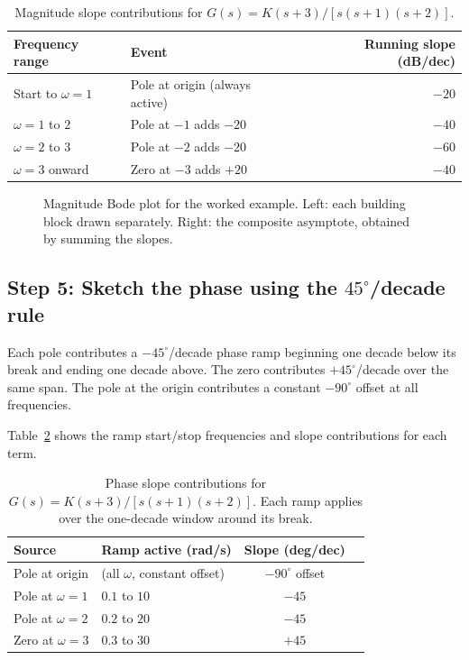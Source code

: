 \documentclass[../../book.tex]{subfiles}
\begin{document}
\begin{table}[htbp]
\centering
\caption{Magnitude slope contributions for $G(s) = K(s+3)/[s(s+1)(s+2)]$.}
\label{tab:example_mag_slopes}
\begin{tabular}{@{}llr@{}}
\toprule
Frequency range & Event & Running slope (dB/dec) \\
\midrule
Start to $\omega = 1$  & Pole at origin (always active) & $-20$ \\
$\omega = 1$ to $2$    & Pole at $-1$ adds $-20$        & $-40$ \\
$\omega = 2$ to $3$    & Pole at $-2$ adds $-20$        & $-60$ \\
$\omega = 3$ onward    & Zero at $-3$ adds $+20$        & $-40$ \\
\bottomrule
\end{tabular}
\end{table}

\begin{figure}[htbp]
  \caption{Magnitude Bode plot for the worked example.  Left: each building
    block drawn separately.  Right: the composite asymptote, obtained by
    summing the slopes.}
  \label{fig:example_magnitude}
\end{figure}

\subsection*{Step 5: Sketch the phase using the $45^\circ$/decade rule}

Each pole contributes a $-45^\circ$/decade phase ramp beginning one decade
below its break and ending one decade above.  The zero contributes
$+45^\circ$/decade over the same span.  The pole at the origin contributes a
constant $-90^\circ$ offset at all frequencies.

Table~\ref{tab:example_phase_slopes} shows the ramp start/stop frequencies
and slope contributions for each term.

\begin{table}[htbp]
\centering
\caption{Phase slope contributions for $G(s) = K(s+3)/[s(s+1)(s+2)]$.
  Each ramp applies over the one-decade window around its break.}
\label{tab:example_phase_slopes}
\begin{tabular}{@{}llcc@{}}
\toprule
Source & Ramp active (rad/s) & Slope (deg/dec) \\
\midrule
Pole at origin & (all $\omega$, constant offset) & $-90^\circ$ offset \\
Pole at $\omega = 1$ & $0.1$ to $10$   & $-45$ \\
Pole at $\omega = 2$ & $0.2$ to $20$   & $-45$ \\
Zero at $\omega = 3$ & $0.3$ to $30$   & $+45$ \\
\bottomrule
\end{tabular}
\end{table}
\end{document}
